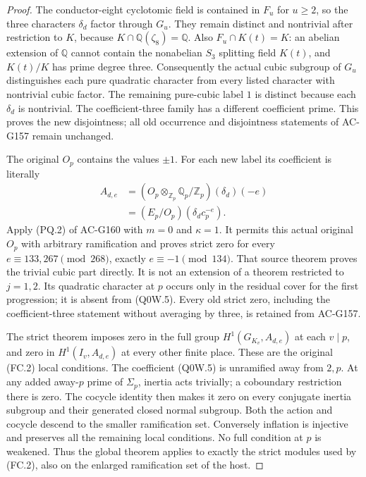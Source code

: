 \begin{proof}
The conductor-eight cyclotomic field is contained in $F_u$
for $u\geq2$, so the three characters $\delta_d$ factor through
$G_u$.  They remain distinct and nontrivial after restriction to
$K$, because $K\cap\mathbb Q(\zeta_8)=\mathbb Q$.
Also $F_u\cap K(t)=K$: an abelian extension of $\mathbb Q$
cannot contain the nonabelian $S_3$ splitting field $K(t)$,
and $K(t)/K$ has prime degree three.
Consequently the actual cubic subgroup of $G_u$ distinguishes
each pure quadratic character from every listed character with
nontrivial cubic factor.  The remaining pure-cubic label $1$
is distinct because each $\delta_d$ is nontrivial.
The coefficient-three family has a different coefficient prime.
This proves the new disjointness; all old occurrence and
disjointness statements of AC-G157 remain unchanged.

The original $O_p$ contains the values $\pm1$.
For each new label its coefficient is literally
\[
 \begin{aligned}
 A_{d,e}&=(O_p\otimes_{\mathbb Z_p}\mathbb Q_p/\mathbb Z_p)
                                                    (\delta_d)(-e)\\
        &=(E_p/O_p)(\delta_dc_p^{-e}).
 \end{aligned}
 \tag{Q0W.5}
\]
Apply (PQ.2) of AC-G160 with $m=0$ and $\kappa=1$.
It permits this actual original $O_p$ with arbitrary ramification
and proves strict zero for every $e\equiv133,267\pmod{268}$,
exactly $e\equiv-1\pmod{134}$.
That source theorem proves the trivial cubic part directly.
It is not an extension of a theorem restricted to $j=1,2$.
Its quadratic character at $p$ occurs only in the residual
cover for the first progression; it is absent from (Q0W.5).
Every old strict zero, including the coefficient-three statement
without averaging by three, is retained from AC-G157.

The strict theorem imposes zero in the full group
$H^1(G_{K_v},A_{d,e})$ at each $v\mid p$, and zero in
$H^1(I_v,A_{d,e})$ at every other finite place.
These are the original (FC.2) local conditions.
The coefficient (Q0W.5) is unramified away from $2,p$.
At any added away-$p$ prime of $\Sigma_p$, inertia acts trivially;
a coboundary restriction there is zero.
The cocycle identity then makes it zero on every conjugate inertia
subgroup and their generated closed normal subgroup.
Both the action and cocycle descend to the smaller ramification
set.  Conversely inflation is injective and preserves all the
remaining local conditions.  No full condition at $p$ is weakened.
Thus the global theorem applies to exactly the strict modules
used by (FC.2), also on the enlarged ramification set of the host.


\end{proof}
